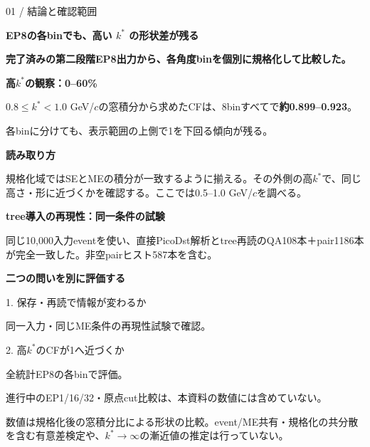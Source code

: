 \documentclass[11pt,a4paper,landscape]{article}
\newcommand{\ttl}[2]{{\small\color{teal}#1}\par{\fontsize{20}{25}\selectfont\bfseries #2}\par\vspace{2mm}}
\newcommand{\note}[1]{\par\colorbox{pale}{\parbox{\dimexpr\linewidth-5mm\relax}{\vspace{1mm}\small #1\vspace{1mm}}}\par}
\newcommand{\warn}[1]{\par\colorbox{warm}{\parbox{\dimexpr\linewidth-5mm\relax}{\vspace{1mm}\small #1\vspace{1mm}}}\par}
\begin{document}
\ttl{01 / 結論と確認範囲}{EP8の各binでも、高い $k^*$ の形状差が残る}
\textbf{完了済みの第二段階EP8出力から、各角度binを個別に規格化して比較した。}

\begin{minipage}[t]{.56\linewidth}\vspace{0pt}
\note{\textbf{高$k^*$の観察：0--60\%}\par
$0.8\le k^*<1.0$ GeV/$c$の窓積分から求めたCFは、8binすべてで\textbf{約0.899--0.923}。\par
各binに分けても、表示範囲の上側で1を下回る傾向が残る。}

\vspace{2mm}
\textbf{読み取り方}\par
規格化域ではSEとMEの積分が一致するように揃える。その外側の高$k^*$で、同じ高さ・形に近づくかを確認する。ここでは0.5--1.0 GeV/$c$を調べる。
\end{minipage}\hfill
\begin{minipage}[t]{.41\linewidth}\vspace{0pt}
\note{\textbf{tree導入の再現性：同一条件の試験}\par
同じ10,000入力eventを使い、直接PicoDst解析とtree再読のQA108本＋pair1186本が完全一致した。非空pairヒスト587本を含む。}
\textbf{二つの問いを別に評価する}\par
1. 保存・再読で情報が変わるか\par
\quad 同一入力・同じME条件の再現性試験で確認。\par
2. 高$k^*$のCFが1へ近づくか\par
\quad 全統計EP8の各binで評価。\par
\vspace{2mm}
進行中のEP1/16/32・原点cut比較は、本資料の数値には含めていない。
\end{minipage}
\warn{数値は規格化後の窓積分比による形状の比較。event/ME共有・規格化の共分散を含む有意差検定や、$k^*\to\infty$の漸近値の推定は行っていない。}
\end{document}
